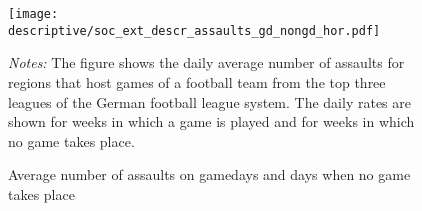 \vspace*{\fill}
\begin{figure}[H]\centering
	\texttt{[image: descriptive/soc\_ext\_descr\_assaults\_gd\_nongd\_hor.pdf]}
	\scriptsize
	\begin{minipage}{\linewidth}
		\caption{Average number of assaults on gamedays and days when no game takes place}\label{fig_soc_ext:assaults_across_dows}
		\emph{Notes:} The figure shows the daily average number of assaults for regions that host games of a football team from the top three leagues of the German football league system. The daily rates are shown for weeks in which a game is played and for weeks in which no game takes place.
	\end{minipage}
\end{figure}
\vspace*{\fill}\clearpage